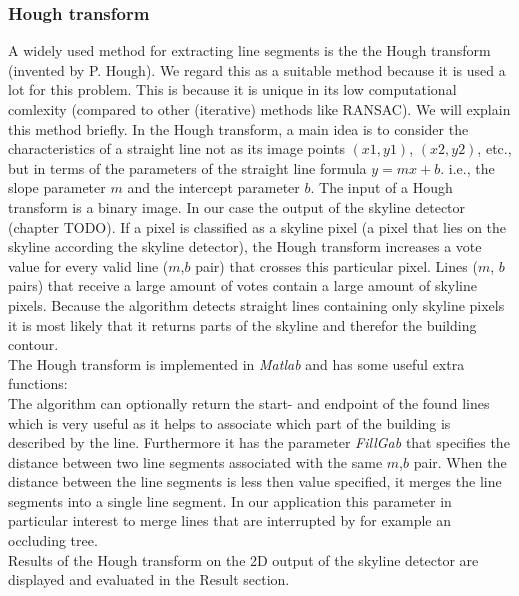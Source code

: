 \documentclass[10pt]{article}
\begin{document}
\subsubsection{Hough transform}
	A widely used method for extracting line segments is the the Hough transform
	(invented by P. Hough).  We regard this as a suitable method because it is
	used a lot for this problem. This is because it is unique in its low
	computational comlexity (compared to other (iterative) methods like RANSAC).
	We will explain this method briefly.
	In the Hough transform, a main idea is to consider the characteristics of a
	straight line not as its image points $(x1, y1)$, $(x2, y2)$, etc., but in
	terms of the parameters of the straight line formula $y = mx + b$. i.e., the
	slope parameter $m$ and the intercept parameter $b$.
	The input of a Hough transform is a binary image. In our case the output of 
	the skyline detector (chapter TODO).
	If a pixel is classified as a skyline pixel (a pixel that lies on the
	skyline according the skyline detector), the Hough transform increases
	a vote value for every valid line ($m$,$b$ pair) that crosses this
	particular pixel.  Lines ($m$, $b$ pairs) that receive a large amount of votes
	contain a large amount of skyline pixels.  
	Because the algorithm detects straight lines containing only skyline pixels it is
	most likely that it returns parts of the skyline and therefor the building contour. \\
	The Hough transform is implemented in \emph{Matlab} and has some useful extra functions:\\
	The algorithm can optionally return the start- and endpoint of the found lines 
	which is very useful as it helps to associate which part of the building is described by the line.
	Furthermore it has the parameter \emph{FillGab} that specifies the distance
	between two line segments associated with the same $m$,$b$ pair. When the
	distance between the line segments is less then value specified, it merges
	the line segments into a single line segment. In our application this
	parameter in particular interest to merge lines that are interrupted by for
	example an occluding tree.\\
	Results of the Hough transform on the 2D output of the skyline detector are
	displayed and evaluated in the Result section.
\end{document}
